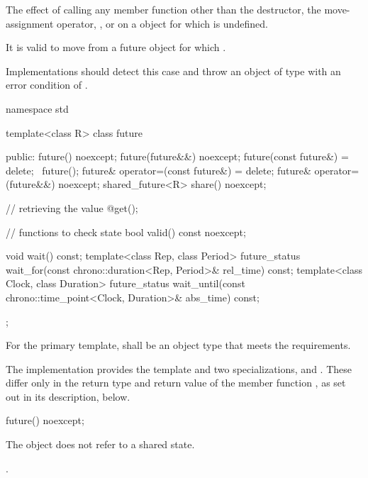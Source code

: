 \pnum
The effect of calling any member function other than the destructor, the
move-assignment operator, , or  on a  object for which
is undefined.
\begin{note}
It is valid to move from a future object for which .
\end{note}

\recommended
Implementations should detect this case and throw an object of type
 with an error condition of .

%
\begin{codeblock}
namespace std {
  template<class R>
  class future {
  public:
    future() noexcept;
    future(future&&) noexcept;
    future(const future&) = delete;
    ~future();
    future& operator=(const future&) = delete;
    future& operator=(future&&) noexcept;
    shared_future<R> share() noexcept;

    // retrieving the value
    @\seebelow@ get();

    // functions to check state
    bool valid() const noexcept;

    void wait() const;
    template<class Rep, class Period>
      future_status wait_for(const chrono::duration<Rep, Period>& rel_time) const;
    template<class Clock, class Duration>
      future_status wait_until(const chrono::time_point<Clock, Duration>& abs_time) const;
  };
}
\end{codeblock}

\pnum
For the primary template,  shall be an object type that
meets the  requirements.

\pnum
The implementation provides the template  and two specializations,
 and . These differ only in the return type and return
value of the member function , as set out in its description, below.

%
\begin{itemdecl}
future() noexcept;
\end{itemdecl}

\begin{itemdescr}
\pnum
\effects
The object does not refer to a shared state.

\pnum
\ensures
{}.
\end{itemdescr}

